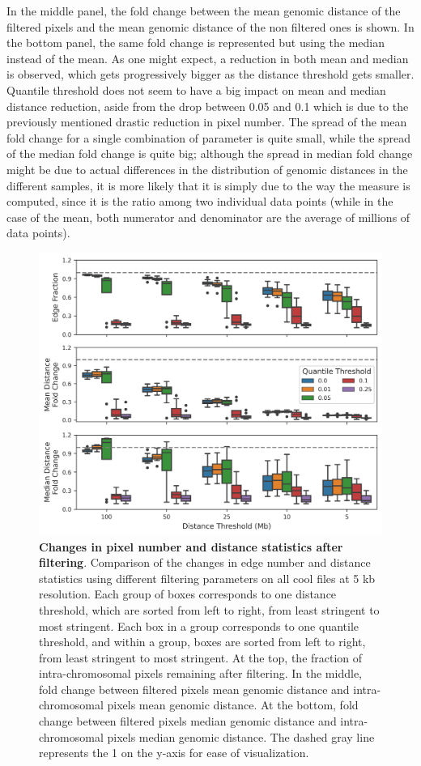 In the middle panel, the fold change between the mean genomic distance of the filtered pixels and the mean genomic distance of the non filtered ones is shown. In the bottom panel, the same fold change is represented but using the median instead of the mean. As one might expect, a reduction in both mean and median is observed, which gets progressively bigger as the distance threshold gets smaller. Quantile threshold does not seem to have a big impact on mean and median distance reduction, aside from the drop between 0.05 and 0.1 which is due to the previously mentioned drastic reduction in pixel number. The spread of the mean fold change for a single combination of parameter is quite small, while the spread of the median fold change is quite big; although the spread in median fold change might be due to actual differences in the distribution of genomic distances in the different samples, it is more likely that it is simply due to the way the measure is computed, since it is the ratio among two individual data points (while in the case of the mean, both numerator and denominator are the average of millions of data points).

\begin{figure}[ht]
  \centering
  \includegraphics[width=1\textwidth]{filtering_stats.png}
  \caption{\textbf{Changes in pixel number and distance statistics after filtering}. Comparison of the changes in edge number and distance statistics using different filtering parameters on all cool files at 5 kb resolution. Each group of boxes corresponds to one distance threshold, which are sorted from left to right, from least stringent to most stringent. Each box in a group corresponds to one quantile threshold, and within a group, boxes are sorted from left to right, from least stringent to most stringent. At the top, the fraction of intra-chromosomal pixels remaining after filtering. In the middle, fold change between filtered pixels mean genomic distance and intra-chromosomal pixels mean genomic distance. At the bottom, fold change between filtered pixels median genomic distance and intra-chromosomal pixels median genomic distance. The dashed gray line represents the 1 on the y-axis for ease of visualization.}
  \label{fig:filtering}
\end{figure}

